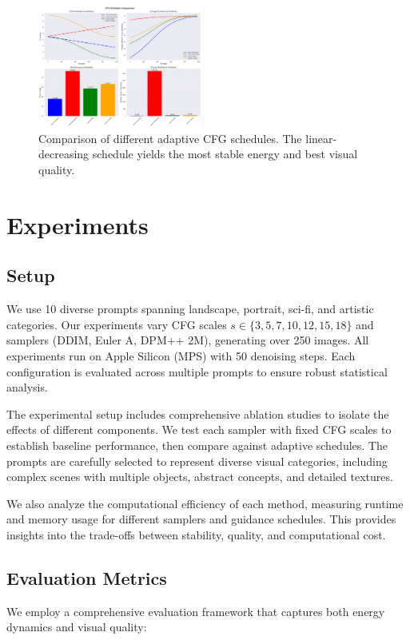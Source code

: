 \documentclass[10pt,twocolumn]{article}
\begin{document}
\begin{figure}[H]
    \centering
    \includegraphics[width=0.48\textwidth]{figures/cfg_schedules_comparison.png}
    \caption{Comparison of different adaptive CFG schedules. The linear-decreasing schedule yields the most stable energy and best visual quality.}
    \label{fig:cfg_schedules}
\end{figure}

\section{Experiments}
\subsection{Setup}
We use 10 diverse prompts spanning landscape, portrait, sci-fi, and artistic categories. Our experiments vary CFG scales $s \in \{3, 5, 7, 10, 12, 15, 18\}$ and samplers (DDIM, Euler A, DPM++ 2M), generating over 250 images. All experiments run on Apple Silicon (MPS) with 50 denoising steps. Each configuration is evaluated across multiple prompts to ensure robust statistical analysis.

The experimental setup includes comprehensive ablation studies to isolate the effects of different components. We test each sampler with fixed CFG scales to establish baseline performance, then compare against adaptive schedules. The prompts are carefully selected to represent diverse visual categories, including complex scenes with multiple objects, abstract concepts, and detailed textures.

We also analyze the computational efficiency of each method, measuring runtime and memory usage for different samplers and guidance schedules. This provides insights into the trade-offs between stability, quality, and computational cost.

\subsection{Evaluation Metrics}
We employ a comprehensive evaluation framework that captures both energy dynamics and visual quality:
\end{document}
